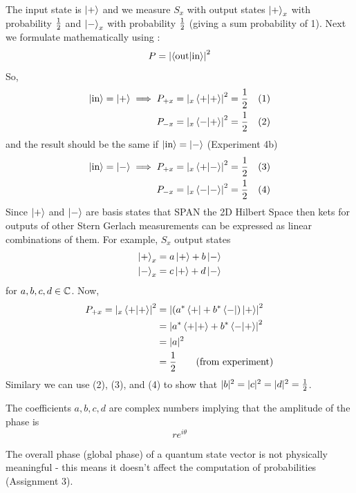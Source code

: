 \documentclass[english, 11pt]{article}
\begin{document}
          The input state is $\left|+\right\rangle$ and we measure $S_x$ with output states $\left|+\right\rangle_x$ with probability $\frac{1}{2}$ and $\left|-\right\rangle_x$ with probability $\frac{1}{2}$ (giving a sum probability of 1). Next we formulate mathematically using  :
          \[ P = \left| \braket{\mbox{out}}{\mbox{in}} \right|^2 \]
          So,
          \begin{align*}
            \ket{\mbox{in}}  = \ket{+} \implies P_{+x} & = \left| {}_x\braket{+}{+} \right|^2 = \f{1}{2} & (1) \\
            P_{-x} & = \left| {}_x\braket{-}{+} \right|^2 = \f{1}{2} & (2) \\
          \end{align*}
          and the result should be the same if $\left|\mbox{in}\right\rangle = \left|-\right\rangle$ (Experiment 4b)
          \begin{align*}
            \ket{\mbox{in}}  = \ket{-} \implies P_{+x} & = \left| {}_x\braket{+}{-} \right|^2 = \f{1}{2} & (3) \\
            P_{-x} & = \left| {}_x\braket{-}{-} \right|^2 = \f{1}{2} & (4) \\
          \end{align*}
          Since $\left|+\right\rangle$ and $\left|-\right\rangle$ are basis states that SPAN the 2D Hilbert Space then kets for outputs of other Stern Gerlach measurements can be expressed as linear combinations of them. For example, $S_x$ output states
          \begin{align*}
            \left|+\right\rangle_x & = a \left|+\right\rangle + b\left|-\right\rangle \\
            \left|-\right\rangle_x & = c \left|+\right\rangle + d\left|-\right\rangle
          \end{align*}
          for $a,b,c,d \in {\mathbb{C}}$. Now,
          \begin{align*}
            P_{+x} = \left| {}_x\braket{+}{+} \right|^2 & = \left| \left( a^*\bra{+} + b^*\bra{-} \right)\ket{+} \right|^2 \\
            & = \left|  a^*\braket{+}{+} + b^*\braket{-}{+} \right|^2 \\
            & = |a|^2 \\
            & = \f{1}{2} \mbox{ \ \ \ \ \ (from experiment)}
          \end{align*}
          Similary we can use (2), (3), and (4) to show that $|b|^2 = |c|^2 = |d|^2 = \frac{1}{2}$.
          \newline

          The coefficients $a,b,c,d$ are complex numbers implying that the amplitude of the phase is
          \[ re^{i\theta} \]
          \begin{note}
            The overall phase (global phase) of a quantum state vector is not physically meaningful - this means it doesn't affect the computation of probabilities (Assignment 3).
          \end{note}
\end{document}
